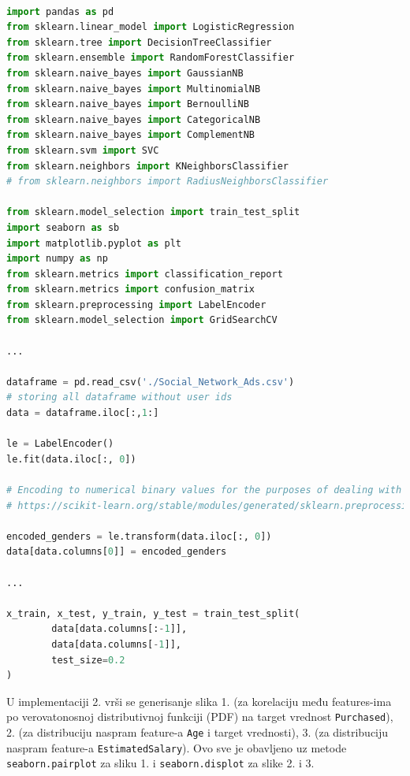 \documentclass[fontsize=12bp, paper=a4]{scrarticle}
\begin{document}
\begin{lstlisting}[language=Python, caption=Predprocesiranje podataka i navođenje modula koji će se koristiti]

import pandas as pd
from sklearn.linear_model import LogisticRegression
from sklearn.tree import DecisionTreeClassifier
from sklearn.ensemble import RandomForestClassifier
from sklearn.naive_bayes import GaussianNB
from sklearn.naive_bayes import MultinomialNB
from sklearn.naive_bayes import BernoulliNB
from sklearn.naive_bayes import CategoricalNB
from sklearn.naive_bayes import ComplementNB
from sklearn.svm import SVC
from sklearn.neighbors import KNeighborsClassifier
# from sklearn.neighbors import RadiusNeighborsClassifier

from sklearn.model_selection import train_test_split
import seaborn as sb
import matplotlib.pyplot as plt
import numpy as np
from sklearn.metrics import classification_report
from sklearn.metrics import confusion_matrix
from sklearn.preprocessing import LabelEncoder
from sklearn.model_selection import GridSearchCV

...

dataframe = pd.read_csv('./Social_Network_Ads.csv')
# storing all dataframe without user ids
data = dataframe.iloc[:,1:]

le = LabelEncoder()
le.fit(data.iloc[:, 0])

# Encoding to numerical binary values for the purposes of dealing with NaiveBayes classificators 
# https://scikit-learn.org/stable/modules/generated/sklearn.preprocessing.LabelEncoder.html

encoded_genders = le.transform(data.iloc[:, 0])
data[data.columns[0]] = encoded_genders

...

x_train, x_test, y_train, y_test = train_test_split(
		data[data.columns[:-1]],
		data[data.columns[-1]],
		test_size=0.2
)
\end{lstlisting}


\vbox{}

\vbox{}

U implementaciji 2. vrši se generisanje slika 1. (za korelaciju među features-ima po verovatonosnoj distributivnoj funkciji (PDF) na target vrednost \verb|Purchased|), 2. (za distribuciju naspram feature-a \verb|Age| i target vrednosti), 3. (za distribuciju naspram feature-a \verb|EstimatedSalary|). Ovo sve je obavljeno uz metode \verb|seaborn.pairplot| za sliku 1.\cite{pairplot} i \verb|seaborn.displot| za slike 2. i 3.\cite{displot}
\end{document}
